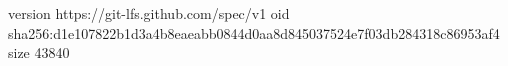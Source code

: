 version https://git-lfs.github.com/spec/v1
oid sha256:d1e107822b1d3a4b8eaeabb0844d0aa8d845037524e7f03db284318c86953af4
size 43840
